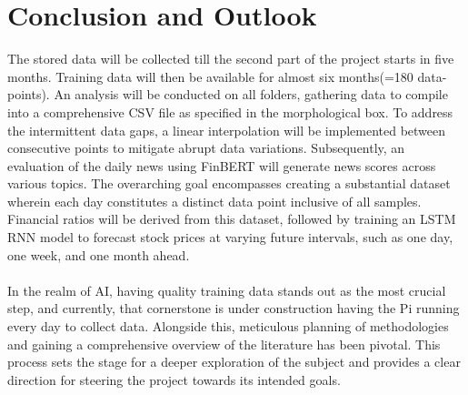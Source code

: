 \clearpage
{}
\section{Conclusion and Outlook} \label{sec: ConclusionOutlook}

The stored data will be collected till the second part of the project starts in five months. Training data will then be available for almost six months(=180 data-points). An analysis will be conducted on all folders, gathering data to compile into a comprehensive \ac{CSV} file as specified in the morphological box. To address the intermittent data gaps, a linear interpolation will be implemented between consecutive points to mitigate abrupt data variations. Subsequently, an evaluation of the daily news using \ac{FinBERT} will generate news scores across various topics. The overarching goal encompasses creating a substantial dataset wherein each day constitutes a distinct data point inclusive of all samples. Financial ratios will be derived from this dataset, followed by training an \ac{LSTM} \ac{RNN} model to forecast stock prices at varying future intervals, such as one day, one week, and one month ahead.\\
\\
In the realm of \ac{AI}, having quality training data stands out as the most crucial step, and currently, that cornerstone is under construction having the \ac{Pi} running every day to collect data. Alongside this, meticulous planning of methodologies and gaining a comprehensive overview of the literature has been pivotal. This process sets the stage for a deeper exploration of the subject and provides a clear direction for steering the project towards its intended goals.